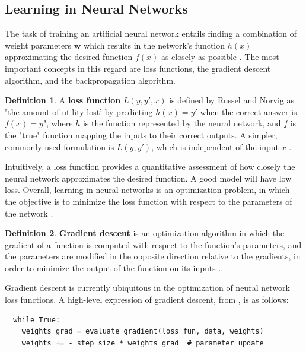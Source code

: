 \documentclass[12pt, titlepage]{report}
\theoremstyle{definition}
\newtheorem{definition}{Definition}
\begin{document}
\subsection{Learning in Neural Networks}
The task of training an artificial neural network entails finding a combination of weight parameters $\bm{w}$ which results in the network's function $h(x)$ approximating the desired function $f(x)$ as closely as possible \cite[p. 718]{russel2009artificial}. The most important concepts in this regard are loss functions, the gradient descent algorithm, and the backpropagation algorithm.
 
\begin{definition}
A \textbf{loss function} $L(y, y', x)$ is defined by Russel and Norvig as "the amount of utility lost' by predicting $h(x) = y'$ when the correct answer is $f(x) = y$", where $h$ is the function represented by the neural network, and $f$ is the "true" function mapping the inputs to their correct outputs. A simpler, commonly used formulation is $L(y, y')$, which is independent of the input $x$ \cite{russel2009artificial}.
\end{definition}

Intuitively, a loss function provides a quantitative assessment of how closely the neural network approximates the desired function. A good model will have low loss. Overall, learning in neural networks is an optimization problem, in which the objective is to minimize the loss function with respect to the parameters of the network \cite[Linear classification: Support Vector Machine, Softmax]{karpathy2017cs231n}.

\begin{definition}
\textbf{Gradient descent} is an optimization algorithm in which the gradient of a function is computed with respect to the function's parameters, and the parameters are modified in the opposite direction relative to the gradients, in order to minimize the output of the function on its inputs \cite{[Optimization: Stochastic Gradient Descent] karpathy2017cs231n}.
\end{definition}

Gradient descent is currently ubiquitous in the optimization of neural network loss functions. A high-level expression of gradient descent, from \cite{karpathy2017cs231n}, is as follows:

\begin{verbatim}
  while True:
    weights_grad = evaluate_gradient(loss_fun, data, weights)
    weights += - step_size * weights_grad  # parameter update
\end{verbatim}
\end{document}
